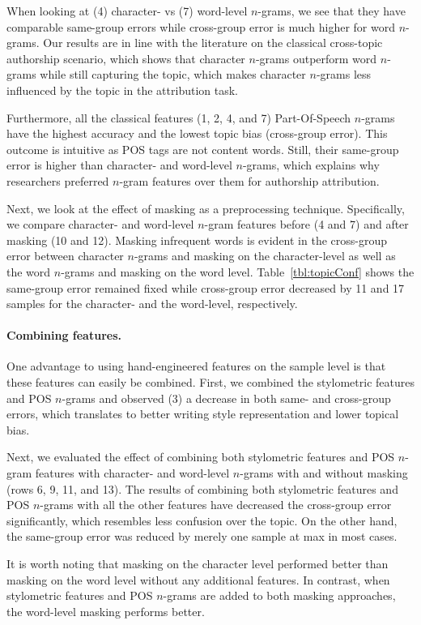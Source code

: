 \documentclass[11pt]{article}
\begin{document}
When looking at (4) character- vs (7) word-level $n$-grams, we see that they have comparable same-group errors while cross-group error is much higher for word $n$-grams. Our results are in line with the literature on the classical cross-topic authorship scenario, which shows that character $n$-grams outperform word $n$-grams while still capturing the topic, which makes character $n$-grams less influenced by the topic in the attribution task.

Furthermore, all the classical features (1, 2, 4, and 7) Part-Of-Speech $n$-grams have the highest accuracy and the lowest topic bias (cross-group error). This outcome is intuitive as POS tags are not content words. Still, their same-group error is higher than character- and word-level $n$-grams, which explains why researchers preferred $n$-gram features over them for authorship attribution.  

Next, we look at the effect of masking as a preprocessing technique. Specifically, we compare character- and word-level $n$-gram features before (4 and 7) and after masking (10 and 12). Masking infrequent words is evident in the cross-group error between character $n$-grams and masking on the character-level as well as the word $n$-grams and masking on the word level. Table~\ref{tbl:topicConf} shows the same-group error remained fixed while cross-group error decreased by 11 and 17 samples for the character- and the word-level, respectively. 

\paragraph{Combining features.} One advantage to using hand-engineered features on the sample level is that these features can easily be combined. First, we combined the stylometric features and POS $n$-grams and observed (3) a decrease in both same- and cross-group errors, which translates to better writing style representation and lower topical bias. 

Next, we evaluated the effect of combining both stylometric features and POS $n$-gram features with character- and word-level $n$-grams with and without masking (rows 6, 9, 11, and 13). The results of combining both stylometric features and POS $n$-grams with all the other features have decreased the cross-group error significantly, which resembles less confusion over the topic. On the other hand, the same-group error was reduced by merely one sample at max in most cases. 

It is worth noting that masking on the character level performed better than masking on the word level without any additional features. In contrast, when stylometric features and POS $n$-grams are added to both masking approaches, the word-level masking performs better.
\end{document}
